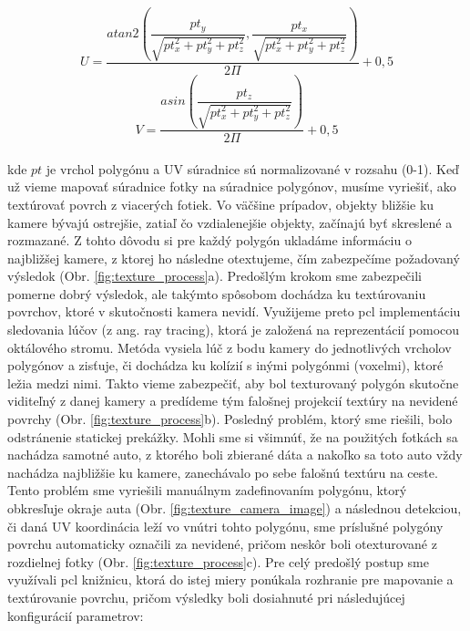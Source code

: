 \begin{equation}
  U = \frac{atan2\left(\dfrac{pt_y}{\sqrt{pt_x^2 + pt_y^2 + pt_z^2}} , \dfrac{pt_x}{\sqrt{pt_x^2 + pt_y^2 + pt_z^2}}\right)} {2\Pi} + 0,5
  \label{eq:texturing2}
\end{equation}
\begin{equation}
  V = \frac{asin\left(\dfrac{pt_z}{\sqrt{pt_x^2 + pt_y^2 + pt_z^2}}\right)} {2\Pi} + 0,5
  \label{eq:texturing3}
\end{equation} 
\\
\noindent kde $pt$ je vrchol polygónu a UV súradnice sú normalizované v rozsahu (0-1).
\newline\indent Keď už vieme mapovať súradnice fotky na súradnice polygónov, musíme vyriešiť, ako textúrovať povrch z viacerých fotiek. Vo väčšine prípadov, objekty bližšie ku kamere bývajú ostrejšie, zatiaľ čo vzdialenejšie objekty, začínajú byť skreslené a rozmazané. Z tohto dôvodu si pre každý polygón ukladáme informáciu o najbližšej kamere, z ktorej ho následne otextujeme, čím zabezpečíme požadovaný výsledok (Obr. \ref{fig:texture_process}a).
\newline\indent Predošlým krokom sme zabezpečili pomerne dobrý výsledok, ale takýmto spôsobom dochádza ku textúrovaniu povrchov, ktoré v skutočnosti kamera nevidí. Využijeme preto \acrshort{pcl} implementáciu sledovania lúčov (z ang. ray tracing), ktorá je založená na reprezentácií pomocou oktálového stromu. Metóda vysiela lúč z bodu kamery do jednotlivých vrcholov polygónov a zisťuje, či dochádza ku kolízií s inými polygónmi (voxelmi), ktoré ležia medzi nimi. Takto vieme zabezpečiť, aby bol texturovaný polygón skutočne viditeľný z danej kamery a predídeme tým falošnej projekcií textúry na nevidené povrchy (Obr. \ref{fig:texture_process}b).
\newline\indent Posledný problém, ktorý sme riešili, bolo odstránenie statickej prekážky. Mohli sme si všimnúť, že na použitých fotkách sa nachádza samotné auto, z ktorého boli zbierané dáta a nakoľko sa toto auto vždy nachádza najbližšie ku kamere, zanechávalo po sebe falošnú textúru na ceste. Tento problém sme vyriešili manuálnym zadefinovaním polygónu, ktorý obkresľuje okraje auta (Obr. \ref{fig:texture_camera_image}) a následnou detekciou, či daná UV koordinácia leží vo vnútri tohto polygónu, sme príslušné polygóny povrchu automaticky označili za nevidené, pričom neskôr boli otexturované z rozdielnej fotky (Obr. \ref{fig:texture_process}c).
\newline\indent Pre celý predošlý postup sme využívali \acrshort{pcl} knižnicu, ktorá do istej miery ponúkala rozhranie pre mapovanie a textúrovanie povrchu, pričom výsledky boli dosiahnuté pri následujúcej konfigurácií parametrov:

